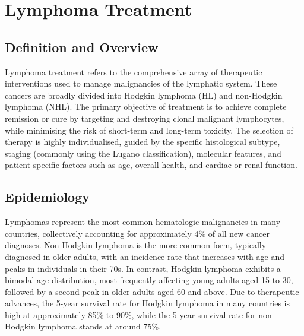 \chapter{Lymphoma Treatment}

\section*{Definition and Overview}
Lymphoma treatment refers to the comprehensive array of therapeutic interventions used to manage malignancies of the lymphatic system. These cancers are broadly divided into Hodgkin lymphoma (HL) and non-Hodgkin lymphoma (NHL). The primary objective of treatment is to achieve complete remission or cure by targeting and destroying clonal malignant lymphocytes, while minimising the risk of short-term and long-term toxicity. The selection of therapy is highly individualised, guided by the specific histological subtype, staging (commonly using the Lugano classification), molecular features, and patient-specific factors such as age, overall health, and cardiac or renal function.

\section*{Epidemiology}
Lymphomas represent the most common hematologic malignancies in many countries, collectively accounting for approximately 4\% of all new cancer diagnoses. Non-Hodgkin lymphoma is the more common form, typically diagnosed in older adults, with an incidence rate that increases with age and peaks in individuals in their 70s. In contrast, Hodgkin lymphoma exhibits a bimodal age distribution, most frequently affecting young adults aged 15 to 30, followed by a second peak in older adults aged 60 and above. Due to therapeutic advances, the 5-year survival rate for Hodgkin lymphoma in many countries is high at approximately 85\% to 90\%, while the 5-year survival rate for non-Hodgkin lymphoma stands at around 75\%.

